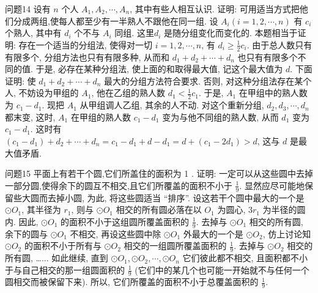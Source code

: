 问题14 设有 $n$ 个人 $A_1, A_2, \cdots, A_n$, 其中有些人相互认识.
证明: 可用适当方式把他们分成两组,使每人都至少有一半熟人不跟他在同一组.
设 $A_i(i=1,2, \cdots, n)$ 有 $c_i$ 个熟人, 其中有 $d_i$ 个不与 $A_i$ 同组.
这里$d_i$ 是随分组变化而变化的.
本题相当于证明: 存在一个适当的分组法, 使得对一切 $i=1,2, \cdots, n$, 有 $d_i \geqslant \frac{1}{2} c_i$.
由于总人数只有有限多个, 分组方法也只有有限多种, 从而和 $d_1+ d_2+\cdots+d_n$ 也只有有限多个不同的值.
于是, 必存在某种分组法, 使上面的和取得最大值, 记这个最大值为 $d$. 下面证明: 使 $d_1+d_2+\cdots+d_n$ 最大的分组方法符合要求.
否则, 对这种分组法存在某个人, 不妨设为甲组的 $A_1$, 他在乙组的熟人数 $d_1<\frac{1}{2} c_1$. 于是, $A_1$ 在甲组中的熟人数为 $c_1-d_1$. 现把 $A_1$ 从甲组调人乙组, 其余的人不动.
对这个重新分组, $d_2, d_3, \cdots, d_n$ 都末变, 这时, $A_1$ 在甲组的熟人数 $c_1-d_1$ 变为与他不同组的熟人数, 从而 $d_1$ 变为 $c_1-d_1$. 这时有 $\left(c_1-d_1\right)+d_2+\cdots+d_n=c_1-d_1+d-d_1=d+\left(c_1-2 d_1\right)>d$, 这与 $d$ 是最大值矛盾.



问题15 平面上有若干个圆,它们所盖住的面积为 1 . 证明: 一定可以从这些圆中去掉一部分圆,使得余下的圆互不相交,且它们所覆盖的面积不小于 $\frac{1}{9}$.
显然应尽可能地保留些大圆而去掉小圆, 为此, 将这些圆适当 “排序”. 设这若干个圆中最大的一个是 $\odot O_1$, 其半径为 $r_1$, 则与 $\odot O_1$ 相交的所有圆必落在以 $O_1$ 为圆心, $3 r_1$ 为半径的圆内.
因此, $\odot O_1$ 的面积不小于这组圆所覆盖面积的 $\frac{1}{9}$. 去掉与 $\odot O_1$ 相交的所有圆, 余下的圆与 $\odot O_1$ 不相交, 再设这些圆中除 $\odot O_1$ 外最大的一个是 $\odot O_2$, 仿上讨论知 $\odot O_2$ 的面积不小于所有与 $\odot O_2$ 相交的一组圆所覆盖面积的 $\frac{1}{9}$. 去掉与 $\odot O_2$ 相交的所有圆, …... 如此继续, 直到 $\odot O_1, \odot O_2, \cdots, \odot O_n$ 它们彼此都不相交, 且面积都不小于与自己相交的那一组圆面积的 $\frac{1}{9}$ (它们中的某几个也可能一开始就不与任何一个圆相交而被保留下来). 所以, 它们所覆盖的面积不小于总覆盖面积的 $\frac{1}{9}$.



